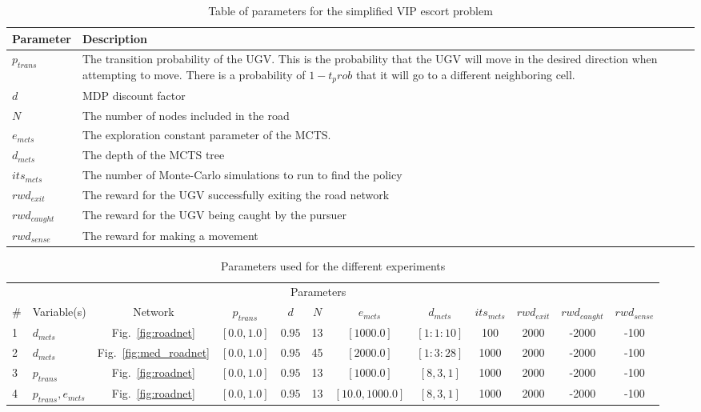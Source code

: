 \tymin=80pt
\begin{table}[tbp]
\footnotesize
\caption{Table of parameters for the simplified VIP escort problem}
\begin{tabulary}{\linewidth}{LL}
\hline
Parameter    & Description\\
\hline
$p_{trans}$    & The transition probability of the UGV. This is the probability that the UGV will move in the desired direction when attempting to move. There is a probability of $1-t_prob$ that it will go to a different neighboring cell. \\
$d$            & MDP discount factor\\
$N$            & The number of nodes included in the road\\
$e_{mcts}$     & The exploration constant parameter of the MCTS.\\
$d_{mcts}$     & The depth of the MCTS tree\\
$its_{mcts}$   & The number of Monte-Carlo simulations to run to find the policy\\
$rwd_{exit}$   & The reward for the UGV successfully exiting the road network\\
$rwd_{caught}$ & The reward for the UGV being caught by the pursuer\\
$rwd_{sense}$  & The reward for making a movement\\
\hline
\end{tabulary}
\end{table}
\begin{table}
    \footnotesize
    \centering
    \caption{Parameters used for the different experiments}
    \label{tab:exps}
    \begin{tabular}{llcccccccccc} \toprule
        &\multicolumn{10}{c}{Parameters} \\ \cmidrule(r){3-12}
        \#  & Variable(s) & Network &$p_{trans}$&$d$&$N$&$e_{mcts}$&$d_{mcts}$&$its_{mcts}$&$rwd_{exit}$&$rwd_{caught}$&$rwd_{sense}$ \\ \midrule
        1 & ${d_{mcts}}$ & Fig.~\ref{fig:roadnet} & $[0.0,1.0]$ & $0.95$ & 13 & $[1000.0]$ & $[1:1:10]$ & 100 & 2000 & -2000 & -100\\
        2 & ${d_{mcts}}$ & Fig.~\ref{fig:med_roadnet} & $[0.0,1.0]$ & $0.95$ & 45 & $[2000.0]$ & $[1:3:28]$ & 1000 & 2000 & -2000 & -100\\
        3 & ${p_{trans}}$& Fig.~\ref{fig:roadnet} & $[0.0,1.0]$ & $0.95$ & 13 & $[1000.0]$ & $[8,3,1]$ & 1000 & 2000 & -2000 & -100\\
        4 & ${p_{trans},e_{mcts}}$ & Fig.~\ref{fig:roadnet} & $[0.0,1.0]$ & $0.95$ & 13 & $[10.0,1000.0]$ & $[8,3,1]$ & 1000 & 2000 & -2000 & -100\\
    \end{tabular}
\end{table}

